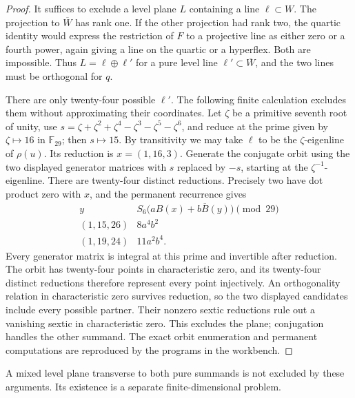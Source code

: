 \begin{proof}
It suffices to exclude a level plane $L$ containing a line $\ell\subset W$.
The projection to $\overline W$ has rank one. If the other projection had rank two, the quartic identity would express the restriction of $F$ to a projective line as either zero or a fourth power, again giving a line on the quartic or a hyperflex. Both are impossible. Thus
$L=\ell\oplus\ell'$ for a pure level line $\ell'\subset\overline W$, and the two lines must be orthogonal for $q$.

There are only twenty-four possible $\ell'$. The following finite calculation excludes them without approximating their coordinates. Let $\zeta$ be a primitive seventh root of unity, use
$s=\zeta+\zeta^2+\zeta^4-\zeta^3-\zeta^5-\zeta^6$, and reduce at the prime given by $\zeta\mapsto16$ in $\mathbb F_{29}$; then $s\mapsto15$.
By transitivity we may take $\ell$ to be the $\zeta$-eigenline of $\rho(u)$.
Its reduction is $x=(1,16,3)$. Generate the conjugate orbit using the two displayed generator matrices with $s$ replaced by $-s$, starting at the $\zeta^{-1}$-eigenline. There are twenty-four distinct reductions. Precisely two have dot product zero with $x$, and the permanent recurrence gives
\[
\begin{array}{c|c}
 y&S_6\bigl(aB(x)+b\overline B(y)\bigr)\pmod {29}\\\hline
 (1,15,26)&8a^4b^2\\
 (1,19,24)&11a^2b^4.
\end{array}
\]
Every generator matrix is integral at this prime and invertible after reduction. The orbit has twenty-four points in characteristic zero, and its twenty-four distinct reductions therefore represent every point injectively. An orthogonality relation in characteristic zero survives reduction, so the two displayed candidates include every possible partner. Their nonzero sextic reductions rule out a vanishing sextic in characteristic zero. This excludes the plane; conjugation handles the other summand. The exact orbit enumeration and permanent computations are reproduced by the programs in the workbench.
\end{proof}

A mixed level plane transverse to both pure summands is not excluded by these arguments. Its existence is a separate finite-dimensional problem.

